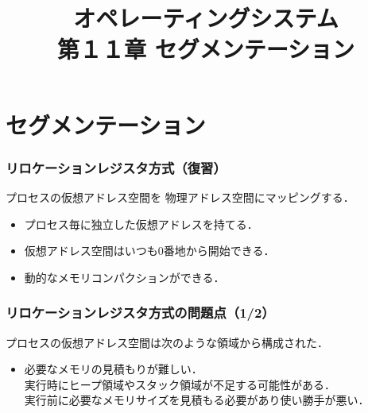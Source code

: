 \documentclass{beamer}                   %
\begin{document}
\title[主記憶]{オペレーティングシステム\\第１１章 セグメンテーション}
\date{}

\begin{frame}
  \titlepage
\end{frame}


\section{セグメンテーション}
\begin{frame}
  \frametitle{リロケーションレジスタ方式（復習）}
  プロセスの仮想アドレス空間を
  物理アドレス空間にマッピングする．

  \begin{itemize}
  \item プロセス毎に独立した仮想アドレスを持てる．
  \item 仮想アドレス空間はいつも0番地から開始できる．
  \item 動的なメモリコンパクションができる．
  \end{itemize}
\end{frame}

\begin{frame}
  \frametitle{リロケーションレジスタ方式の問題点（1/2）}
  プロセスの仮想アドレス空間は次のような領域から構成された．

  \begin{itemize}
  \item 必要なメモリの見積もりが難しい．\\
    実行時にヒープ領域やスタック領域が不足する可能性がある．\\
    実行前に必要なメモリサイズを見積もる必要があり使い勝手が悪い．
  \end{itemize}
\end{frame}
\end{document}
